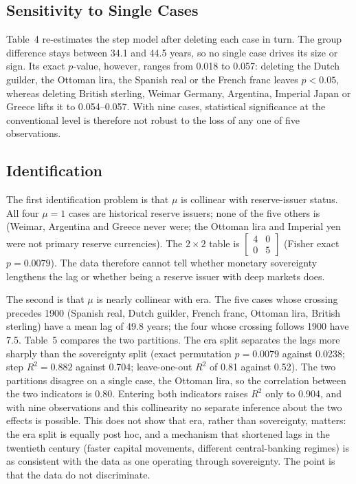 \documentclass[11pt,letterpaper]{article}
\theoremstyle{definition}
\theoremstyle{plain}
\begin{document}
\subsection{Sensitivity to Single Cases}\label{sec:loco}
Table~4 re-estimates the step model after deleting each case in turn. The group difference stays between 34.1 and 44.5 years, so no single case drives its size or sign. Its exact $p$-value, however, ranges from 0.018 to 0.057: deleting the Dutch guilder, the Ottoman lira, the Spanish real or the French franc leaves $p<0.05$, whereas deleting British sterling, Weimar Germany, Argentina, Imperial Japan or Greece lifts it to 0.054--0.057. With nine cases, statistical significance at the conventional level is therefore not robust to the loss of any one of five observations.

\subsection{Identification}\label{sec:ident}
The first identification problem is that $\mu$ is collinear with reserve-issuer status. All four $\mu=1$ cases are historical reserve issuers; none of the five others is (Weimar, Argentina and Greece never were; the Ottoman lira and Imperial yen were not primary reserve currencies). The $2\times2$ table is $\left[\begin{smallmatrix}4&0\\0&5\end{smallmatrix}\right]$ (Fisher exact $p=0.0079$). The data therefore cannot tell whether monetary sovereignty lengthens the lag or whether being a reserve issuer with deep markets does.

The second is that $\mu$ is nearly collinear with era. The five cases whose crossing precedes 1900 (Spanish real, Dutch guilder, French franc, Ottoman lira, British sterling) have a mean lag of 49.8 years; the four whose crossing follows 1900 have 7.5. Table~5 compares the two partitions. The era split separates the lags more sharply than the sovereignty split (exact permutation $p=0.0079$ against 0.0238; step $R^2=0.882$ against 0.704; leave-one-out $R^2$ of 0.81 against 0.52). The two partitions disagree on a single case, the Ottoman lira, so the correlation between the two indicators is 0.80. Entering both indicators raises $R^2$ only to 0.904, and with nine observations and this collinearity no separate inference about the two effects is possible. This does not show that era, rather than sovereignty, matters: the era split is equally post hoc, and a mechanism that shortened lags in the twentieth century (faster capital movements, different central-banking regimes) is as consistent with the data as one operating through sovereignty. The point is that the data do not discriminate.
\end{document}
